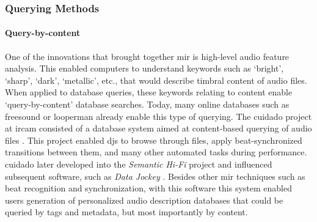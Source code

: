 \subsubsection{Querying Methods}
{
	\paragraph{Query-by-content}
	One of the innovations that brought together \gls{mir} is high-level audio feature analysis. This enabled computers to understand keywords such as `bright', `sharp', `dark', `metallic', etc., that would describe timbral content of audio files. When applied to database queries, these keywords relating to content enable `query-by-content' database searches. Today, many online databases such as \gls{freesound} or \gls{looperman} already enable this type of querying. The \gls{cuidado} project at \gls{ircam} consisted of a database system aimed at content-based querying of audio files \parencite{DBLP:conf/ismir/VinetHP02, DBLP:conf/icmc/VinetHP02, DBLP:conf/icmc/Vinet05}. This project enabled \glspl{dj} to browse through files, apply beat-synchronized transitions between them, and many other automated tasks during performance. \gls{cuidado} later developed into the \textit{Semantic Hi-Fi} project and influenced subsequent software, such as \textit{Data Jockey} \parencite{icmc/bbp2372.2007.117}. Besides other \gls{mir} techniques such as beat recognition and synchronization, with this software this system enabled users generation of personalized audio description databases that could be queried by tags and metadata, but most importantly by content.

}
